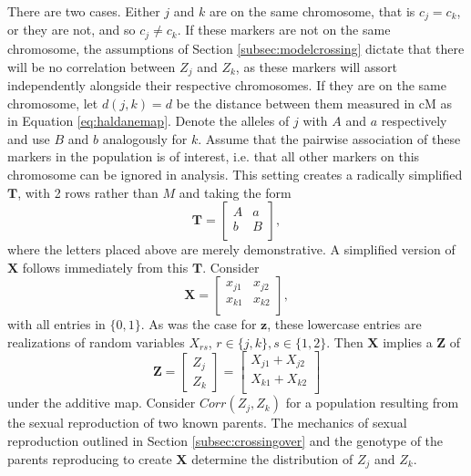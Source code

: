 \documentclass[sts]{imsart}
\newcommand{\ve}[1]{\mathbf{#1}}           %
\newcommand{\m}[1]{\mathbf{#1}}               %
\begin{document}
There are two cases. Either $j$ and $k$ are on the same chromosome, that is $c_j = c_k$, or they are not, and so $c_j \neq c_k$. If these markers are not on the same chromosome, the assumptions of Section \ref{subsec:modelcrossing} dictate that there will be no correlation between $Z_j$ and $Z_k$, as these markers will assort independently alongside their respective chromosomes. If they are on the same chromosome, let $d(j,k) = d$ be the distance between them measured in cM as in Equation \ref{eq:haldanemap}. Denote the alleles of $j$ with $A$ and $a$ respectively and use $B$ and $b$ analogously for $k$. Assume that the pairwise association of these markers in the population is of interest, i.e. that all other markers on this chromosome can be ignored in analysis. This setting creates a radically simplified $\m{T}$, with 2 rows rather than $M$ and taking the form
$$\m{T} = \begin{bmatrix}
  A & a \\
  b & B \\
\end{bmatrix},$$
where the letters placed above are merely demonstrative. A simplified version of $\m{X}$ follows immediately from this $\m{T}$. Consider
$$\m{X} = \begin{bmatrix}
  x_{j1} & x_{j2} \\
  x_{k1} & x_{k2} \\
\end{bmatrix},$$
with all entries in $\{0,1\}$. As was the case for $\ve{z}$, these lowercase entries are realizations of random variables $X_{rs}$, $r \in \{j,k\}, s \in \{1,2\}$. Then $\m{X}$ implies a $\ve{Z}$ of
$$\ve{Z} = \begin{bmatrix} Z_j \\ Z_k \end{bmatrix} = \begin{bmatrix}
  X_{j1} + X_{j2} \\
  X_{k1} + X_{k2} \\
\end{bmatrix}$$
under the additive map. Consider $Corr(Z_j, Z_k)$ for a population resulting from the sexual reproduction of two known parents.
The mechanics of sexual reproduction outlined in Section \ref{subsec:crossingover} and the genotype of the parents reproducing to create $\m{X}$ determine the distribution of $Z_j$ and $Z_k$.
\end{document}
